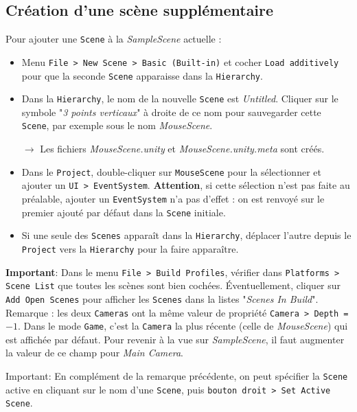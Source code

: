 \documentclass[a4paper,10pt]{article}
\newenvironment{solution}%
{\begin{tcolorbox}[breakable,colback=red!5!white,colframe=red!75!black,title=Solution]}%
{\end{tcolorbox}}
\begin{document}
\ifversionenseignant
\begin{solution}
\subsection{Création d'une scène supplémentaire}
	
Pour ajouter une \texttt{Scene} à la \textit{SampleScene} actuelle :
\begin{itemize}
	\item Menu \texttt{File > New Scene > Basic (Built-in)} et cocher \texttt{Load additively} pour que la seconde \texttt{Scene} apparaisse dans la \texttt{Hierarchy}.
	\item Dans la \texttt{Hierarchy}, le nom de la nouvelle \texttt{Scene} est \textit{Untitled}. Cliquer sur le symbole "\textit{3 points verticaux}" à droite de ce nom pour sauvegarder cette \texttt{Scene}, par exemple sous le nom \textit{MouseScene}.
	\item[$\rightarrow$] Les fichiers \textit{MouseScene.unity} et \textit{MouseScene.unity.meta} sont créés.
	\item Dans le \texttt{Project}, double-cliquer sur \texttt{MouseScene} pour la sélectionner et ajouter un \texttt{UI > EventSystem}. \textbf{Attention}, si cette sélection n'est pas faite au préalable, ajouter un \texttt{EventSystem} n'a pas d'effet : on est renvoyé sur le premier ajouté par défaut dans la \texttt{Scene} initiale.
	\item Si une seule des \texttt{Scenes} apparaît dans la \texttt{Hierarchy}, déplacer l'autre depuis le \texttt{Project} vers la \texttt{Hierarchy} pour la faire apparaître.
\end{itemize}	
		
\textbf{Important}: Dans le menu \texttt{File > Build Profiles}, vérifier dans \texttt{Platforms > Scene List} que toutes les scènes sont bien cochées. Éventuellement, cliquer sur \texttt{Add Open Scenes} pour afficher les \texttt{Scenes} dans la listes "\textit{Scenes In Build}".\\

Remarque : les deux \texttt{Cameras} ont la même valeur de propriété \texttt{Camera > Depth = $-1$}. Dans le mode \texttt{Game}, c'est la \texttt{Camera} la plus récente (celle de \textit{MouseScene}) qui est affichée par défaut. Pour revenir à la vue sur \textit{SampleScene}, il faut augmenter la valeur de ce champ pour \textit{Main Camera}.

Important: En complément de la remarque précédente, on peut spécifier la \texttt{Scene} active en cliquant sur le nom d'une \texttt{Scene}, puis \texttt{bouton droit > Set Active Scene}.


\end{solution}
\end{document}
